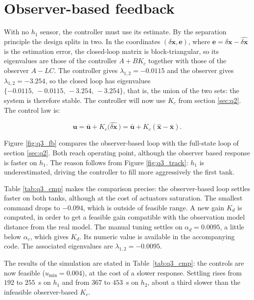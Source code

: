 \documentclass[10pt,a4paper]{scrartcl}
\begin{document}
\section{Observer-based feedback}
With no $h_1$ sensor, the controller must use its estimate. By the separation principle the design splits in two. In the coordinates $(\delta\bm{x},\bm{e})$, where $\bm{e}=\delta\bm{x}-\widehat{\delta\bm{x}}$ is the estimation error, the closed-loop matrix is block-triangular, so its eigenvalues are those of the controller $A+BK_c$ together with those of the observer $A-LC$. The controller gives $\lambda_{1,2}=-0.0115$ and the observer gives $\lambda_{1,2}=-3.254$, so the closed loop has eigenvalues \footnotesize $\{-0.0115,\,-0.0115,\,-3.254,\,-3.254\}$, \normalsize that is, the union of the two sets: the system is therefore stable. The controller will now use $K_c$ from section \ref{sec:q2}.  The control law is:

\begin{equation}
    \bm{u}=\bar{\bm{u}}+K_c\big(\widehat{\delta\bm{x}}\,\big)
          =\bar{\bm{u}}+K_c(\hat{\bm{x}}-\bar{\bm{x}}).
    \label{eq:q3_fb}
\end{equation}

Figure \ref{fig:q3_fb} compares the observer-based loop with the full-state loop of section \ref{sec:q2}. Both reach operating point, although the observer based response is faster on $h_1$. The reason follows from Figure \ref{fig:q3_track}: $h_1$ is underestimated, driving the controller to fill more aggressively the first tank. 

Table \ref{tab:q3_cmp} makes the comparison precise: the observer-based loop settles faster on both tanks, although at the cost of actuators saturation. The smallest command drops to $-0.094$, which is outside of feasible range. A new gain $K_d$ is computed, in order to get a feasible gain compatible with the observation model distance from the real model. The manual tuning settles on $\alpha_d=0.0095$, a little below $\alpha_c$, which gives $K_d$. Its numeric value is available in the accompanying code. The associated eigenvalues are $\lambda_{1,2}=-0.0095$. 

The results of the simulation are stated in Table~\ref{tab:q3_cmp}: the controls are now feasible ($u_{\min}=0.004$), at the cost of a slower
response. Settling rises from $192$ to $255$~s on $h_1$ and from $367$ to $453$~s on $h_2$, about a third slower than the infeasible observer-based $K_c$.
\end{document}
